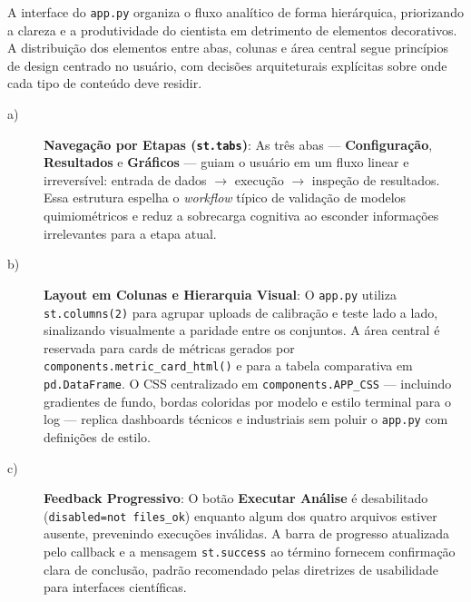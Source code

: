 A interface do \texttt{app.py} organiza o fluxo analítico de forma hierárquica,
priorizando a clareza e a produtividade do cientista em detrimento de elementos
decorativos. A distribuição dos elementos entre abas, colunas e área central segue
princípios de design centrado no usuário, com decisões arquiteturais explícitas sobre
onde cada tipo de conteúdo deve residir.

\begin{description}

\item[a)] \textbf{Navegação por Etapas (\texttt{st.tabs})}: As três abas —
\textbf{Configuração}, \textbf{Resultados} e \textbf{Gráficos} — guiam o usuário em um
fluxo linear e irreversível: entrada de dados $\rightarrow$ execução $\rightarrow$
inspeção de resultados. Essa estrutura espelha o \textit{workflow} típico de validação de
modelos quimiométricos e reduz a sobrecarga cognitiva ao esconder informações irrelevantes
para a etapa atual.

\item[b)] \textbf{Layout em Colunas e Hierarquia Visual}: O \texttt{app.py} utiliza
\texttt{st.columns(2)} para agrupar uploads de calibração e teste lado a lado,
sinalizando visualmente a paridade entre os conjuntos. A área central é reservada para
cards de métricas gerados por \texttt{components.metric\_card\_html()} e para a tabela
comparativa em \texttt{pd.DataFrame}. O CSS centralizado em \texttt{components.APP\_CSS}
— incluindo gradientes de fundo, bordas coloridas por modelo e estilo terminal para o
log — replica dashboards técnicos e industriais sem poluir o \texttt{app.py} com
definições de estilo.

\item[c)] \textbf{Feedback Progressivo}: O botão \textbf{Executar Análise} é
desabilitado (\texttt{disabled=not files\_ok}) enquanto algum dos quatro arquivos estiver
ausente, prevenindo execuções inválidas. A barra de progresso atualizada pelo callback e
a mensagem \texttt{st.success} ao término fornecem confirmação clara de conclusão,
padrão recomendado pelas diretrizes de usabilidade para interfaces científicas.


\end{description}
